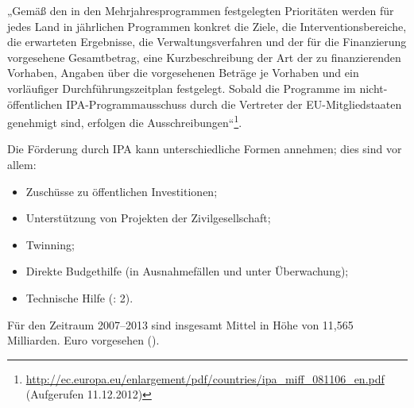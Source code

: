 „Gemäß den in den Mehrjahresprogrammen festgelegten Prioritäten werden für jedes Land in jährlichen Programmen konkret die Ziele, die Interventionsbereiche, die erwarteten Ergebnisse, die Verwaltungsverfahren und der für die Finanzierung vorgesehene Gesamtbetrag, eine Kurzbeschreibung der Art der zu finanzierenden Vorhaben, Angaben über die vorgesehenen Beträge je Vorhaben und ein vorläufiger Durchführungszeitplan festgelegt. Sobald die Programme im nicht-öffentlichen IPA-Programmausschuss durch die Vertreter der EU-Mitgliedstaaten genehmigt sind, erfolgen die Ausschreibungen“\footnote{\url{http://ec.europa.eu/enlargement/pdf/countries/ipa_miff_081106_en.pdf} (Aufgerufen 11.12.2012)}.

Die Förderung durch IPA kann unterschiedliche Formen annehmen; dies sind vor allem:
\begin{itemize}
\item Zuschüsse zu öffentlichen Investitionen;
\item Unterstützung von Projekten der Zivilgesellschaft;
\item Twinning;
\item Direkte Budgethilfe (in Ausnahmefällen und unter Überwachung);
\item Technische Hilfe (\cite{epec11}: 2).
\end{itemize}
Für den Zeitraum 2007–2013 sind insgesamt Mittel in Höhe von 11,565 Milliarden. Euro vorgesehen (\cite{senatskanzlei}).\par


